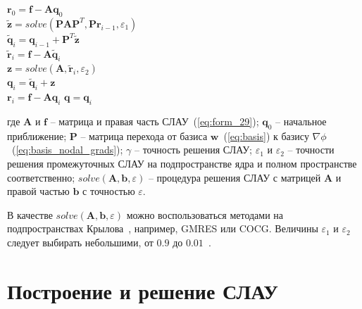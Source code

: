 \documentclass[a4paper,14pt]{article}
\makeatletter
\newcommand{\labelname}[1]{%
	\def\@currentlabelname{#1}}%
\makeatother
\begin{document}
\vspace{1em}
\begin{algorithm}[H]
	\SetAlgoLined
	$\mathbf{r}_0 = \mathbf{f} - \mathbf{A} \mathbf{q}_0$ \\
	{
		$\tilde{\mathbf{z}} = solve(\mathbf{P} \mathbf{A} \mathbf{P}^T , \mathbf{P} \mathbf{r}_{i-1} , \varepsilon_1 )$ \\
		$\tilde{\mathbf{q}}_{i} = \mathbf{q}_{i-1} + \mathbf{P}^T \tilde{\mathbf{z}}$ \\
		$\tilde{\mathbf{r}}_{i} = \mathbf{f} - \mathbf{A} \tilde{\mathbf{q}}_{i}$ \\
		$\mathbf{z} = solve(\mathbf{A}, \tilde{\mathbf{r}}_{i}, \varepsilon_2)$ \\
		$\mathbf{q}_{i} = \tilde{\mathbf{q}}_{i} + \mathbf{z}$ \\
		$\mathbf{r}_{i} = \mathbf{f} - \mathbf{A} \mathbf{q}_{i}$
	}
	$\mathbf{q} = \mathbf{q}_{i}$
\end{algorithm}
\vspace{1em}

\noindent где $\mathbf{A}$ и $\mathbf{f}$ -- матрица и правая часть СЛАУ~(\ref{eq:form_29}); $\mathbf{q}_0$ -- начальное приближение;  $\mathbf{P}$ -- матрица перехода от базиса $\mathbf{w}$~(\ref{eq:basis}) к базису $\nabla \phi$~(\ref{eq:basis_nodal_grads}); $\gamma$ -- точность решения СЛАУ; $\varepsilon_1$ и $\varepsilon_2$ -- точности решения промежуточных СЛАУ на подпространстве ядра и полном пространстве соответственно; $solve(\mathbf{A}, \mathbf{b}, \varepsilon)$ -- процедура решения СЛАУ с матрицей $\mathbf{A}$ и правой частью $\mathbf{b}$ с точностью $\varepsilon$.

В качестве $solve(\mathbf{A}, \mathbf{b}, \varepsilon)$ можно воспользоваться методами на подпространствах Крылова~\citep{balandin_slae, solver_saad, solver_iterative, solver_templates}, например, GMRES или COCG. Величины $\varepsilon_1$ и $\varepsilon_2$ следует выбирать небольшими, от $0.9$ до $0.01$~\citep{nechaev}.
%


\clearpage
\section{Построение и решение СЛАУ}
\labelname{2}\label{sec:build_slae}
\end{document}
